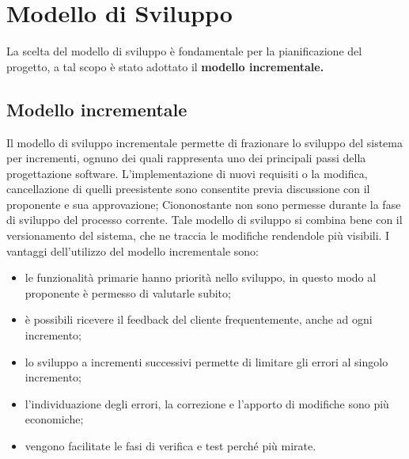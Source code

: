 \section{Modello di Sviluppo}
La scelta del modello di sviluppo è fondamentale per la pianificazione del progetto, a tal scopo è stato adottato il \textbf{modello incrementale.}

\subsection{Modello incrementale}
Il modello di sviluppo incrementale permette di frazionare lo sviluppo del sistema per incrementi, ognuno dei quali rappresenta uno dei principali passi della progettazione software.
L'implementazione di nuovi requisiti o la modifica, cancellazione di quelli preesistente sono consentite previa discussione con il proponente e sua approvazione; Ciononostante non sono permesse durante la fase di sviluppo del processo corrente.
Tale modello di sviluppo si combina bene con il versionamento del sistema, che ne traccia le modifiche rendendole più visibili.
I vantaggi dell'utilizzo del modello incrementale sono:
\begin{itemize}
    \item le funzionalità primarie hanno priorità nello sviluppo, in questo modo al proponente è permesso di valutarle subito;
    \item è possibili ricevere il feedback del cliente frequentemente, anche ad ogni incremento;
    \item lo sviluppo a incrementi successivi permette di limitare gli errori al singolo incremento;
    \item l'individuazione degli errori, la correzione e l'apporto di modifiche sono più economiche;
    \item vengono facilitate le fasi di verifica e test perché più mirate.
\end{itemize} 